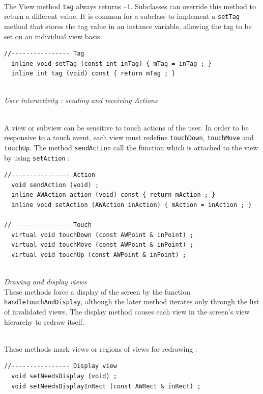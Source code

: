 \documentclass[a4paper,11pt]{extarticle}
\begin{document}
~\\The View method \texttt{tag} always returns –1. Subclasses can override this method to return a different value. It is common for a subclass to implement a \texttt{setTag} method that stores the tag value in an instance variable, allowing the tag to be set on an individual view basis. 

\begin{lstlisting}[language=Arduinonl]
//---------------- Tag
  inline void setTag (const int inTag) { mTag = inTag ; }
  inline int tag (void) const { return mTag ; }
\end{lstlisting}

~\\ \emph{User interactivity : sending and receiving Actions}

~\\A view or subview can be sensitive to touch actions of the user. In order to be responsive to a touch event, each view must redefine \texttt{touchDown}, \texttt{touchMove} and \texttt{touchUp}. The method \texttt{sendAction} call the function which is attached to the view by using \texttt{setAction} :

\begin{lstlisting}[language=Arduinonl]
//---------------- Action
  void sendAction (void) ;
  inline AWAction action (void) const { return mAction ; }
  inline void setAction (AWAction inAction) { mAction = inAction ; }

//---------------- Touch
  virtual void touchDown (const AWPoint & inPoint) ;
  virtual void touchMove (const AWPoint & inPoint) ;
  virtual void touchUp (const AWPoint & inPoint) ;
\end{lstlisting}

~\\ \emph{Drawing and display views}
~\\ These methods force a display of the screen by the function \texttt{handleTouchAndDisplay}, although the later method iterates only through the list of invalidated views. The display method causes each view in the screen's view hierarchy to redraw itself. 

~\\ These methods mark views or regions of views for redrawing 
:
\begin{lstlisting}[language=Arduinonl]
//---------------- Display view
  void setNeedsDisplay (void) ;
  void setNeedsDisplayInRect (const AWRect & inRect) ;
\end{lstlisting}
\end{document}
